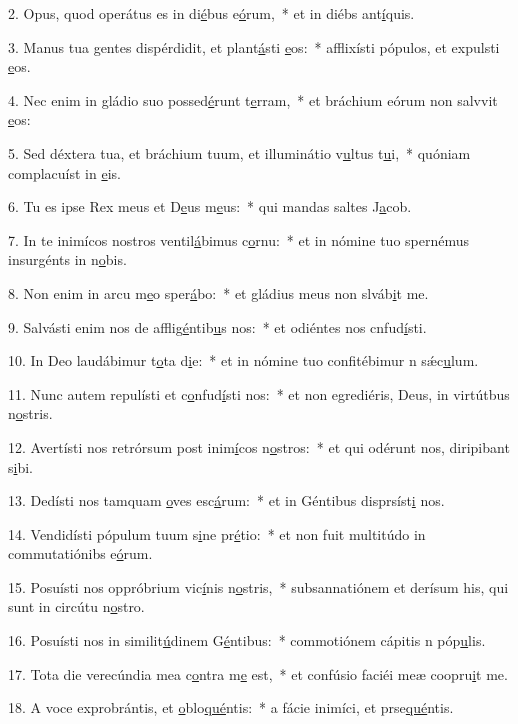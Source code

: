 2. Opus, quod operátus es in di\uline{é}bus e\uline{ó}rum,~* et in diébs ant\uline{í}quis.\par 
3. Manus tua gentes dispérdidit, et plant\uline{á}sti \uline{e}os:~* afflixísti pópulos, et expulsti \uline{e}os.\par 
4. Nec enim in gládio suo possed\uline{é}runt t\uline{e}rram,~* et bráchium eórum non salvvit \uline{e}os:\par 
5. Sed déxtera tua, et bráchium tuum, et illuminátio v\uline{u}ltus t\uline{u}i,~* quóniam complacuíst in \uline{e}is.\par 
6. Tu es ipse Rex meus et D\uline{e}us m\uline{e}us:~* qui mandas saltes J\uline{a}cob.\par 
7. In te inimícos nostros ventil\uline{á}bimus c\uline{o}rnu:~* et in nómine tuo spernémus insurgénts in n\uline{o}bis.\par 
8. Non enim in arcu m\uline{e}o sper\uline{á}bo:~* et gládius meus non slváb\uline{i}t me.\par 
9. Salvásti enim nos de afflig\uline{é}ntib\uline{u}s nos:~* et odiéntes nos cnfud\uline{í}sti.\par 
10. In Deo laudábimur t\uline{o}ta d\uline{i}e:~* et in nómine tuo confitébimur n sǽc\uline{u}lum.\par 
11. Nunc autem repulísti et c\uline{o}nfud\uline{í}sti nos:~* et non egrediéris, Deus, in virtútbus n\uline{o}stris.\par 
12. Avertísti nos retrórsum post inim\uline{í}cos n\uline{o}stros:~* et qui odérunt nos, diripibant s\uline{i}bi.\par 
13. Dedísti nos tamquam \uline{o}ves esc\uline{á}rum:~* et in Géntibus disprsíst\uline{i} nos.\par 
14. Vendidísti pópulum tuum s\uline{i}ne pr\uline{é}tio:~* et non fuit multitúdo in commutatiónibs e\uline{ó}rum.\par 
15. Posuísti nos oppróbrium vic\uline{í}nis n\uline{o}stris,~* subsannatiónem et derísum his, qui sunt in circútu n\uline{o}stro.\par 
16. Posuísti nos in similit\uline{ú}dinem G\uline{é}ntibus:~* commotiónem cápitis n póp\uline{u}lis.\par 
17. Tota die verecúndia mea c\uline{o}ntra m\uline{e} est,~* et confúsio faciéi meæ coopru\uline{i}t me.\par 
18. A voce exprobrántis, et \uline{o}blo\uline{qué}ntis:~* a fácie inimíci, et prse\uline{qué}ntis.\par 
